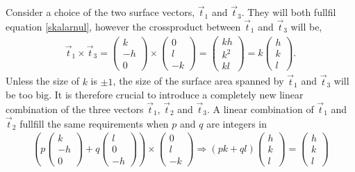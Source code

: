 \documentclass[11pt]{article} %
\begin{document}
Consider a choice of the two surface vectors, $\vec{t}_1$ and $\vec{t}_3$. They will both fullfil equation \ref{skalarnul}, however the crossproduct between $\vec{t}_1$ and $\vec{t}_3$ will be,
\begin{eqnarray}
\vec{t}_1 \times \vec{t}_3 = \left( \begin{array}{c} k \\ - h \\ 0 \end{array} \right) \times \left( \begin{array}{c} 0 \\ l \\ -k \end{array} \right) = \left( \begin{array}{c} kh \\ k^2 \\ kl \end{array} \right) = k \left( \begin{array}{c} h \\  k \\ l \end{array} \right).\nonumber
\end{eqnarray}
Unless the size of $k$ is $\pm 1$, the size of the surface area spanned by $\vec{t}_1$ and $\vec{t}_3$ will be too big. It is therefore crucial to introduce a completely new linear combination of the three vectors $\vec{t}_1$, $\vec{t}_2$ and $\vec{t}_3$. A linear combination of $\vec{t}_1$ and $\vec{t}_2$ fullfill the same requirements when $p$ and $q$ are integers in
\begin{eqnarray}
\left( p \left( \begin{array}{c} k \\ -h \\ 0 \end{array} \right) + q \left( \begin{array}{c} l \\ 0 \\ -h \end{array} \right) \right) \times \left( \begin{array}{c} 0 \\ l \\ -k \end{array} \right) \Rightarrow (pk + ql) \left( \begin{array}{c} h \\ k \\ l \end{array} \right) = \left( \begin{array}{c} h \\ k \\ l \end{array} \right) \label{hkldependency}
\end{eqnarray}
\end{document}
